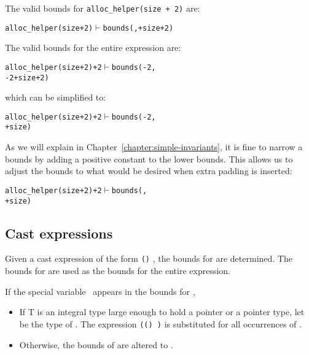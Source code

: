 The valid bounds for \texttt{alloc\_helper(size + 2)} are:

\begin{alltt}
   alloc\_helper(size + 2) \(\vdash\) bounds(\exprcurrentvalue, \exprcurrentvalue + size + 2)
\end{alltt}

The valid bounds for the entire expression are:

\begin{alltt}
    alloc\_helper(size + 2) + 2 \(\vdash\) bounds(\exprcurrentvalue - 2,
                                        \exprcurrentvalue - 2 + size + 2)
\end{alltt}

which can be simplified to:

\begin{alltt}
    alloc\_helper(size + 2) + 2 \(\vdash\) bounds(\exprcurrentvalue - 2, 
                                        \exprcurrentvalue + size)
\end{alltt}

As we will explain in Chapter~\ref{chapter:simple-invariants}, 
it is fine to narrow a bounds by
adding a positive constant to the lower bounds. This allows us to adjust
the bounds to what would be desired when extra padding is inserted:

\begin{alltt}
    alloc\_helper(size + 2) + 2 \(\vdash\) bounds(\exprcurrentvalue, 
                                        \exprcurrentvalue + size)
\end{alltt}

\subsection{Cast expressions}
\label{section:cast-expressions}

Given a cast expression of the form \texttt{()} ,
the bounds for  are determined. The bounds for
 are used as the bounds for the entire expression.

If the special variable \exprcurrentvalue\ appears in the
bounds for ,

\begin{itemize}
\item
  If T is an integral type large enough to hold a pointer or a pointer
  type, let  be the type of . The expression
  \texttt{(() \exprcurrentvalue)} is substituted for
  all occurrences of \exprcurrentvalue.
\item
  Otherwise, the bounds of  are  altered to \boundsnone.
\end{itemize}
  
